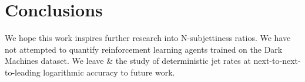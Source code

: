 \section{Conclusions}\label{sec:conclusions}

We hope this work inspires further research into N-subjettiness ratios.
We have not attempted to quantify reinforcement learning agents trained
on the Dark Machines dataset. We leave & the study of deterministic jet
rates at next-to-next-to-leading logarithmic accuracy to future work.

